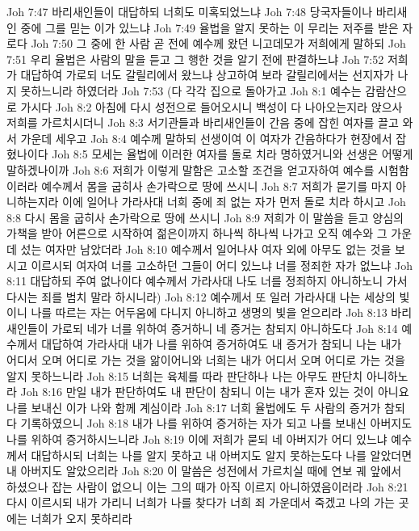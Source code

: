 Joh 7:47  바리새인들이 대답하되 너희도 미혹되었느냐
Joh 7:48  당국자들이나 바리새인 중에 그를 믿는 이가 있느냐
Joh 7:49  율법을 알지 못하는 이 무리는 저주를 받은 자로다
Joh 7:50  그 중에 한 사람 곧 전에 예수께 왔던 니고데모가 저희에게 말하되
Joh 7:51  우리 율법은 사람의 말을 듣고 그 행한 것을 알기 전에 판결하느냐
Joh 7:52  저희가 대답하여 가로되 너도 갈릴리에서 왔느냐 상고하여 보라 갈릴리에서는 선지자가 나지 못하느니라 하였더라
Joh 7:53  (다 각각 집으로 돌아가고
Joh 8:1  예수는 감람산으로 가시다
Joh 8:2  아침에 다시 성전으로 들어오시니 백성이 다 나아오는지라 앉으사 저희를 가르치시더니
Joh 8:3  서기관들과 바리새인들이 간음 중에 잡힌 여자를 끌고 와서 가운데 세우고
Joh 8:4  예수께 말하되 선생이여 이 여자가 간음하다가 현장에서 잡혔나이다
Joh 8:5  모세는 율법에 이러한 여자를 돌로 치라 명하였거니와 선생은 어떻게 말하겠나이까
Joh 8:6  저희가 이렇게 말함은 고소할 조건을 얻고자하여 예수를 시험함이러라 예수께서 몸을 굽히사 손가락으로 땅에 쓰시니
Joh 8:7  저희가 묻기를 마지 아니하는지라 이에 일어나 가라사대 너희 중에 죄 없는 자가 먼저 돌로 치라 하시고
Joh 8:8  다시 몸을 굽히사 손가락으로 땅에 쓰시니
Joh 8:9  저희가 이 말씀을 듣고 양심의 가책을 받아 어른으로 시작하여 젊은이까지 하나씩 하나씩 나가고 오직 예수와 그 가운데 섰는 여자만 남았더라
Joh 8:10  예수께서 일어나사 여자 외에 아무도 없는 것을 보시고 이르시되 여자여 너를 고소하던 그들이 어디 있느냐 너를 정죄한 자가 없느냐
Joh 8:11  대답하되 주여 없나이다 예수께서 가라사대 나도 너를 정죄하지 아니하노니 가서 다시는 죄를 범치 말라 하시니라)
Joh 8:12  예수께서 또 일러 가라사대 나는 세상의 빛이니 나를 따르는 자는 어두움에 다니지 아니하고 생명의 빛을 얻으리라
Joh 8:13  바리새인들이 가로되 네가 너를 위하여 증거하니 네 증거는 참되지 아니하도다
Joh 8:14  예수께서 대답하여 가라사대 내가 나를 위하여 증거하여도 내 증거가 참되니 나는 내가 어디서 오며 어디로 가는 것을 앎이어니와 너희는 내가 어디서 오며 어디로 가는 것을 알지 못하느니라
Joh 8:15  너희는 육체를 따라 판단하나 나는 아무도 판단치 아니하노라
Joh 8:16  만일 내가 판단하여도 내 판단이 참되니 이는 내가 혼자 있는 것이 아니요 나를 보내신 이가 나와 함께 계심이라
Joh 8:17  너희 율법에도 두 사람의 증거가 참되다 기록하였으니
Joh 8:18  내가 나를 위하여 증거하는 자가 되고 나를 보내신 아버지도 나를 위하여 증거하시느니라
Joh 8:19  이에 저희가 묻되 네 아버지가 어디 있느냐 예수께서 대답하시되 너희는 나를 알지 못하고 내 아버지도 알지 못하는도다 나를 알았더면 내 아버지도 알았으리라
Joh 8:20  이 말씀은 성전에서 가르치실 때에 연보 궤 앞에서 하셨으나 잡는 사람이 없으니 이는 그의 때가 아직 이르지 아니하였음이러라
Joh 8:21  다시 이르시되 내가 가리니 너희가 나를 찾다가 너희 죄 가운데서 죽겠고 나의 가는 곳에는 너희가 오지 못하리라
